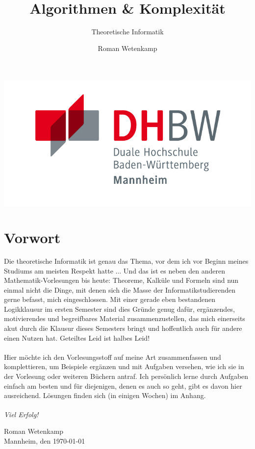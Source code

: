 \documentclass[11pt,a4paper]{scrartcl}
\author{Roman Wetenkamp}
\title{Algorithmen \& Komplexität}
\subtitle{Theoretische Informatik}
\begin{document}
\vspace{3cm}
\maketitle
\begin{center}
\includegraphics[scale=0.7]{DHBW.jpg}
\end{center}
\pagebreak
\tableofcontents
\pagebreak
\section*{Vorwort}
Die theoretische Informatik ist genau das Thema, vor dem ich vor Beginn meines Studiums am meisten Respekt hatte ... Und das ist es neben den anderen Mathematik-Vorlesungen bis heute: Theoreme, Kalküle und Formeln sind nun einmal nicht die Dinge, mit denen sich die Masse der Informatikstudierenden gerne befasst, mich eingeschlossen. Mit einer  gerade eben bestandenen Logikklausur im ersten Semester sind dies Gründe genug dafür, ergänzendes, motivierendes und begreifbares Material zusammenzustellen, das mich einerseits akut durch die Klausur dieses Semesters bringt und hoffentlich auch für andere einen Nutzen hat. Geteiltes Leid ist halbes Leid! \\\\
Hier möchte ich den Vorlesungsstoff auf meine Art zusammenfassen und komplettieren, um Beispiele ergänzen und mit Aufgaben versehen, wie ich sie in der Vorlesung oder weiteren Büchern antraf. Ich persönlich lerne durch Aufgaben einfach am besten und für diejenigen, denen es auch so geht, gibt es davon hier ausreichend. Lösungen finden sich (in einigen Wochen) im Anhang. \\\\
\textit{Viel Erfolg!}  \\
\begin{flushright}
Roman Wetenkamp \\
Mannheim, den \today
\end{flushright}  
\vfill
\end{document}
